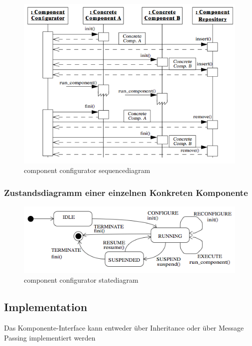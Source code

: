 \begin{figure}[H]
	\centering
	\includegraphics[width=\textwidth]{content/posa2/component-configurator/images/component-configurator-sequencediagram.png}
	\caption{component configurator sequencediagram}
\end{figure}


\subsubsection*{Zustandsdiagramm einer einzelnen Konkreten Komponente}


\begin{figure}[H]
	\centering
	\includegraphics[width=\textwidth]{content/posa2/component-configurator/images/component-configurator-statediagram.png}
	\caption{component configurator statediagram}
\end{figure}


\subsection{Implementation}

Das Komponente-Interface kann entweder über Inheritance oder über Message Passing implementiert werden

